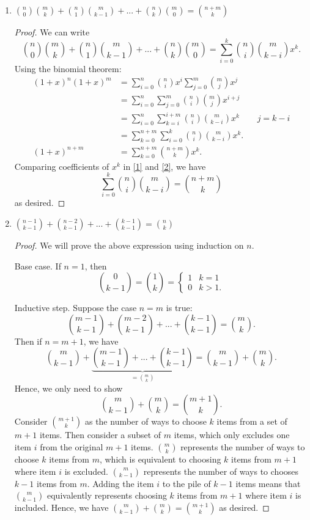 \documentclass{article}
\begin{document}
\begin{enumerate}[label=(\alph*)]
\begin{proof}
\begin{align*}
        &=\sum_{k=0}^{n}\binom{n}{k}^2\\
        &=\binom{n}{0}^2+\binom{n}{1}^2+...+\binom{n}{n}^2\\
        &=\binom{2n}{n}.
    \end{align*}
    \end{proof}
    \item $\binom{n}{0}\binom{m}{k}+\binom{n}{1}\binom{m}{k-1}+...+\binom{n}{k}\binom{m}{0}=\binom{n+m}{k}$
    \begin{proof}
    We can write
    \[\binom{n}{0}\binom{m}{k}+\binom{n}{1}\binom{m}{k-1}+...+\binom{n}{k}\binom{m}{0}=\sum_{i=0}^k\binom{n}{i}\binom{m}{k-i}x^k.\]
    Using the binomial theorem:
    \begin{align*}
        (1+x)^n(1+x)^m
        &=\sum_{i=0}^n\binom{n}{i}x^i\sum_{j=0}^m\binom{m}{j}x^j\\
        &=\sum_{i=0}^n\sum_{j=0}^m\binom{n}{i}\binom{m}{j}x^{i+j}\\
        &=\sum_{i=0}^n\sum_{k=i}^{i+m}\binom{n}{i}\binom{m}{k-i}x^k&&j=k-i\\
        &=\sum_{k=0}^{n+m}{\sum_{i=0}^k\binom{n}{i}\binom{m}{k-i}}x^k\tag{1}\label{1}.\\
        (1+x)^{n+m}
        &=\sum_{k=0}^{n+m}{\binom{n+m}{k}}x^k\tag{2}\label{2}.
    \end{align*} 
    Comparing coefficients of $x^k$ in \eqref{1} and \eqref{2}, we have \[\sum_{i=0}^k\binom{n}{i}\binom{m}{k-i}=\binom{n+m}{k}\] 
    as desired.
    \end{proof}
    \item $\binom{n-1}{k-1}+\binom{n-2}{k-1}+...+\binom{k-1}{k-1}=\binom{n}{k}$
    \begin{proof}
    We will prove the above expression using induction on $n$.
    \par Base case. If $n=1$, then 
    \[\binom{0}{k-1}=\binom{1}{k}=
    \begin{cases}
    1 & k=1\\
    0 & k>1.
    \end{cases}\]
    \par Inductive step. Suppose the case $n=m$ is true: \[\binom{m-1}{k-1}+\binom{m-2}{k-1}+...+\binom{k-1}{k-1}=\binom{m}{k}.\] Then if $n=m+1$, we have
    \[\binom{m}{k-1}+\underbrace{\binom{m-1}{k-1}+...+\binom{k-1}{k-1}}_{=\binom{m}{k}}=\binom{m}{k-1}+\binom{m}{k}.\]
    Hence, we only need to show 
    \[\binom{m}{k-1}+\binom{m}{k}=\binom{m+1}{k}.\]
    Consider $\binom{m+1}{k}$ as the number of ways to choose $k$ items from a set of $m+1$ items. Then consider a subset of $m$ items, which only excludes one item $i$ from the original $m+1$ items. $\binom{m}{k}$ represents the number of ways to choose $k$ items from $m$, which is equivalent to choosing $k$ items from $m+1$ where item $i$ is excluded. $\binom{m}{k-1}$ represents the number of ways to chooses $k-1$ items from $m$. Adding the item $i$ to the pile of $k-1$ items means that $\binom{m}{k-1}$ equivalently represents choosing $k$ items from $m+1$ where item $i$ is included. Hence, we have $\binom{m}{k-1}+\binom{m}{k}=\binom{m+1}{k}$ as desired.

\end{proof}
\end{enumerate}
\end{document}
